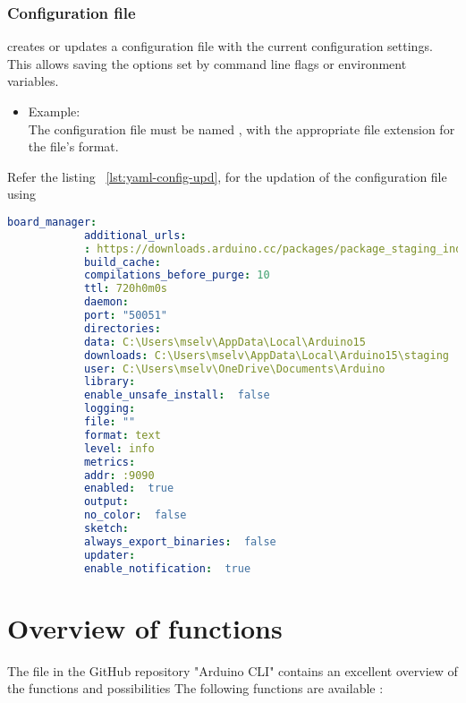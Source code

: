 \subsubsection{Configuration file}
 creates or updates a configuration file with the current configuration settings.
This allows saving the options set by command line flags or environment variables. \cite{ArduinoCLIConfig:2024}
\begin{itemize}
	\item Example:
	\newline
	\\The configuration file must be named , with the appropriate file extension for the file's format.
\end{itemize}

Refer the listing ~\ref{lst:yaml-config-upd}, for the updation of the configuration file using 

\begin{code}
	\begin{center}
		\begin{lstlisting}[language=yaml,caption={Updated settings of the configuration file},label={lst:yaml-config-upd}]
			board_manager:
			additional_urls: 
			: https://downloads.arduino.cc/packages/package_staging_index.json
			build_cache:
			compilations_before_purge: 10
			ttl: 720h0m0s
			daemon:
			port: "50051"
			directories:
			data: C:\Users\mselv\AppData\Local\Arduino15
			downloads: C:\Users\mselv\AppData\Local\Arduino15\staging
			user: C:\Users\mselv\OneDrive\Documents\Arduino
			library:
			enable_unsafe_install:  false
			logging:
			file: ""
			format: text
			level: info
			metrics:
			addr: :9090
			enabled:  true
			output:
			no_color:  false
			sketch:
			always_export_binaries:  false
			updater:
			enable_notification:  true
		\end{lstlisting}
	\end{center}
\end{code}

\section{Overview of functions}
The file  in the GitHub repository "Arduino CLI" contains an excellent overview of the functions and possibilities \cite{ArduinoCLIGit:2024}
The following functions are available \cite{ArduinoCLIversion:2024}:


